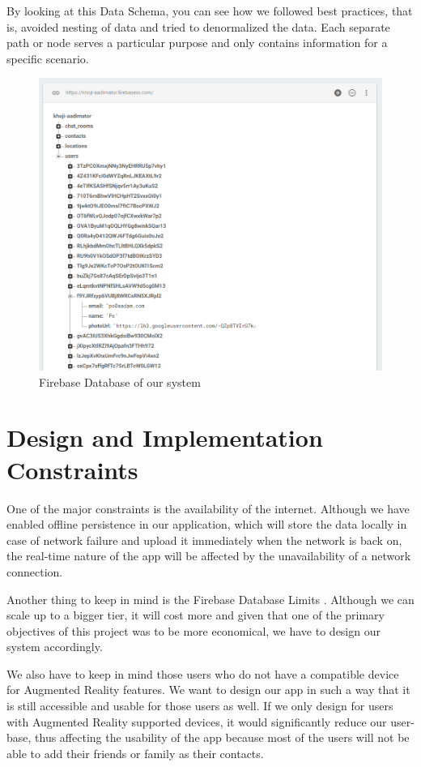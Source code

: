 By looking at this Data Schema, you can see how we followed best practices, that is, avoided nesting of data and tried to denormalized the data. Each separate path or node serves a particular purpose and only contains information for a specific scenario.

\begin{figure}[H]
	\centering
		\includegraphics[width=1.00\textwidth]{images/khoji_firebase_db.PNG}
	\caption{Firebase Database of our system}
	\label{fig:khoji_firebase_db}
\end{figure}


\section{Design and Implementation Constraints}
One of the major constraints is the availability of the internet. Although we have enabled offline persistence in our application, which will store the data locally in case of network failure and upload it immediately when the network is back on, the real-time nature of the app will be affected by the unavailability of a network connection.

Another thing to keep in mind is the Firebase Database Limits \cite{FirebaseUsageLimits2018}. Although we can scale up to a bigger tier, it will cost more and given that one of the primary objectives of this project was to be more economical, we have to design our system accordingly.

We also have to keep in mind those users who do not have a compatible device for Augmented Reality features. We want to design our app in such a way that it is still accessible and usable for those users as well. If we only design for users with Augmented Reality supported devices, it would significantly reduce our user-base, thus affecting the usability of the app because most of the users will not be able to add their friends or family as their contacts.

